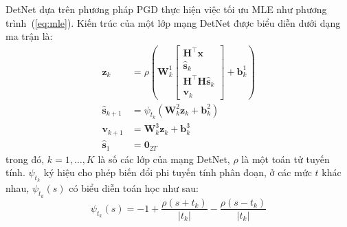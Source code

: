 DetNet dựa trên phương pháp PGD thực hiện việc tối ưu MLE như phương trình~(\ref{eq:mle}).
Kiến trúc của một lớp mạng DetNet được biểu diễn dưới dạng ma trận là:
\allowdisplaybreaks
\begin{subequations}
\begin{alignat}{4}
    \mathbf{z}_k & =\rho\left(\mathbf{W}^1_{k}\left[\begin{array}{c}
    \mathbf{H}^\top \mathbf{x} \\
    \hat{\mathbf{s}}_k \\
    \mathbf{H}^\top \mathbf{H} \hat{\mathbf{s}}_k \\
    \mathbf{v}_k
    \end{array}\right]+\mathbf{b}^1_{k}\right) \\
    \hat{\mathbf{s}}_{k+1} & =\psi_{t_k}\left(\mathbf{W}^2_{k} \mathbf{z}_k+ \mathbf{b}^2_{k}\right) \\
    {\mathbf{v}}_{k+1} & =\mathbf{W}^3_{k} \mathbf{z}_k+ 
    \mathbf{b}^3_{k} \\
    \hat{\mathbf{s}}_1 & =\mathbf{0}_{2T}
\end{alignat}
\end{subequations}
trong đó, $k = 1, \ldots, K$ là số các lớp của mạng DetNet, $\rho$ là một toán tử tuyến tính. $\psi_{t_k}$ ký hiệu cho phép biến đổi phi tuyến tính phân đoạn, ở các mức $t$ khác nhau, $\psi_{t_k}(s)$ có biểu diễn toán học như sau:
\begin{equation}
    \psi_{t_k}(s)=-1+\frac{\rho\left(s + t_k \right)}{\left|t_k\right|}-\frac{\rho\left(s- t_k \right)}{\left|t_k\right|}
\end{equation}

